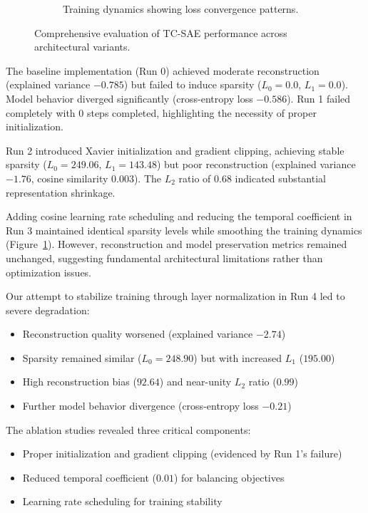 \documentclass{article} %
\begin{document}
\begin{figure}[h]
\begin{subfigure}{0.49\textwidth}
        \caption{Training dynamics showing loss convergence patterns.}
        \label{fig:training_curves}
    \end{subfigure}
    \caption{Comprehensive evaluation of TC-SAE performance across architectural variants.}
    \label{fig:results_summary}
\end{figure}

The baseline implementation (Run 0) achieved moderate reconstruction (explained variance $-0.785$) but failed to induce sparsity ($L_0=0.0$, $L_1=0.0$). Model behavior diverged significantly (cross-entropy loss $-0.586$). Run 1 failed completely with 0 steps completed, highlighting the necessity of proper initialization.

Run 2 introduced Xavier initialization and gradient clipping, achieving stable sparsity ($L_0=249.06$, $L_1=143.48$) but poor reconstruction (explained variance $-1.76$, cosine similarity $0.003$). The $L_2$ ratio of $0.68$ indicated substantial representation shrinkage.

Adding cosine learning rate scheduling and reducing the temporal coefficient in Run 3 maintained identical sparsity levels while smoothing the training dynamics (Figure~\ref{fig:training_curves}). However, reconstruction and model preservation metrics remained unchanged, suggesting fundamental architectural limitations rather than optimization issues.

Our attempt to stabilize training through layer normalization in Run 4 led to severe degradation:
\begin{itemize}
    \item Reconstruction quality worsened (explained variance $-2.74$)
    \item Sparsity remained similar ($L_0=248.90$) but with increased $L_1$ ($195.00$)
    \item High reconstruction bias ($92.64$) and near-unity $L_2$ ratio ($0.99$)
    \item Further model behavior divergence (cross-entropy loss $-0.21$)
\end{itemize}

The ablation studies revealed three critical components:
\begin{itemize}
    \item Proper initialization and gradient clipping (evidenced by Run 1's failure)
    \item Reduced temporal coefficient ($0.01$) for balancing objectives
    \item Learning rate scheduling for training stability
\end{itemize}
\end{document}
